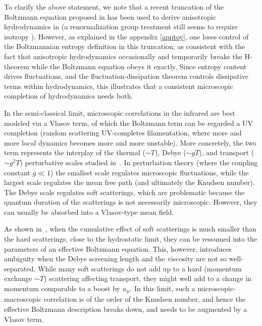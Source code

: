 \documentclass[12pt,onecolumn,showpacs,amssymb,aps,nofootinbib,floatfix]{revtex4-2}
\begin{document}
\color{black}To clarify the above statement, we note that a recent truncation of the Boltzmann equation proposed in \cite{denicol} has been used to derive anisotropic hydrodynamics in \cite{kovtunani} (a renormalization group treatment still seems to require isotropy \cite{kunihiro2}).    However, as explained in the appendix \ref{apptoy}, one loses control of the Boltzmannian entropy definition in this truncation, as consistent with the fact that anisotropic hydrodynamics occasionally and temporarily breaks the H-theorem \cite{GavaCausality2021} while the Boltzmann equation obeys it exactly.   Since entropy content drives fluctuations, and the fluctuation-dissipation theorem controls dissipative terms within hydrodynamics, this illustrates that a consistent microscopic completion of hydrodynamics needs both.
	
	\color{black} 
	In the semi-classical limit, microscopic correlations in the infrared are best modeled via a Vlasov term, of which the Boltzmann term can be regarded a UV completion \cite{villani} (random scattering UV-completes filamentation, where more and more local dynamics becomes more and more unstable).    More concretely, the two term represents  the interplay of the thermal ($\sim T$), Debye ($\sim g T$), and transport ($\sim g^2 T$) perturbative scales studied in~\cite{arnold}.  In perturbation theory (where the coupling constant $g \ll 1$) the smallest scale regulates microscopic fluctuations, while the largest scale regulates the mean free path (and ultimately the Knudsen number).  The Debye scale regulates soft scatterings, which are problematic because the quantum duration of the scatterings is not necessarily microscopic.
        However, they can usually be absorbed into a Vlasov-type mean field\cite{crismanuel}.
        
        As shown in~\cite{arnold}, when the cumulative effect of soft scatterings is much smaller than the hard scatterings, close to the hydrostatic limit, they can be ressumed into the parameters of an effective Boltzmann equation.  This, however, introduces ambiguity when the Debye screening length and the viscosity are not so well-separated.  While many soft scatterings do not add up to a hard (momentum exchange $\sim T$) scattering affecting transport, they might well add to a change in momentum comparable to a boost by $u_\mu$.  In this limit, such a microscopic-macroscopic correlation is of the order of the Knudsen number, and hence the effective Boltzmann description breaks down, and needs to be augmented by a Vlasov term.
\end{document}
